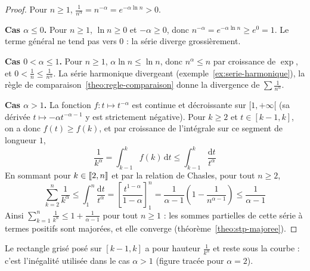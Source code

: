 \begin{proof}
Pour $n\geq 1$, $\frac{1}{n^\alpha}=n^{-\alpha}=e^{-\alpha\ln n}>0$.

\textbf{Cas $\alpha\leq 0$.} Pour $n\geq 1$, $\ln n\geq 0$ et $-\alpha\geq 0$, donc $n^{-\alpha}=e^{-\alpha\ln n}\geq e^0=1$. Le terme général ne tend pas vers $0$ : la série diverge grossièrement.

\textbf{Cas $0<\alpha\leq 1$.} Pour $n\geq 1$, $\alpha\ln n\leq\ln n$, donc $n^\alpha\leq n$ par croissance de $\exp$, et $0<\frac1n\leq\frac{1}{n^\alpha}$. La série harmonique divergeant (exemple~\ref{ex:serie-harmonique}), la règle de comparaison~\ref{theo:regle-comparaison} donne la divergence de $\sum\frac{1}{n^\alpha}$.

\textbf{Cas $\alpha>1$.} La fonction $f:t\mapsto t^{-\alpha}$ est continue et décroissante sur $[1,+\infty[$ (sa dérivée $t\mapsto-\alpha t^{-\alpha-1}$ y est strictement négative). Pour $k\geq 2$ et $t\in[k-1,k]$, on a donc $f(t)\geq f(k)$, et par croissance de l'intégrale sur ce segment de longueur $1$,
\[\frac{1}{k^\alpha}=\int_{k-1}^{k}f(k)\,\mathrm{d}t\leq\int_{k-1}^{k}\frac{\mathrm{d}t}{t^\alpha}\]
En sommant pour $k\in\llbracket 2,n \rrbracket$ et par la relation de Chasles, pour tout $n\geq 2$,
\[\sum_{k=2}^{n}\frac{1}{k^\alpha}\leq\int_{1}^{n}\frac{\mathrm{d}t}{t^\alpha}=\left[\frac{t^{1-\alpha}}{1-\alpha}\right]_1^n=\frac{1}{\alpha-1}\left(1-\frac{1}{n^{\alpha-1}}\right)\leq\frac{1}{\alpha-1}\]
Ainsi $\sum_{k=1}^n\frac{1}{k^\alpha}\leq 1+\frac{1}{\alpha-1}$ pour tout $n\geq 1$ : les sommes partielles de cette série à termes positifs sont majorées, et elle converge (théorème~\ref{theo:stp-majoree}).
\end{proof}

\begin{center}
\end{center}
\noindent Le rectangle grisé posé sur $[k-1,k]$ a pour hauteur $\frac{1}{k^\alpha}$ et reste sous la courbe : c'est l'inégalité utilisée dans le cas $\alpha>1$ (figure tracée pour $\alpha=2$).

